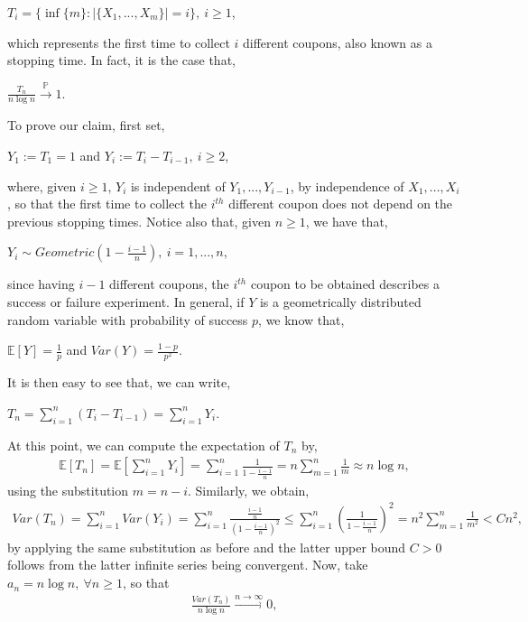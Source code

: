\documentclass{article}
\begin{document}
\begin{center}
	$T_i = \{ \inf \{m\}: |\{X_1,...,X_m\}| = i \}, \ i\geq1$,
\end{center}
which represents the first time to collect $i$ different coupons, also known as a stopping time. In fact, it is the case that,
\begin{center}
	$\frac{T_n}{n\log{n}} \xrightarrow{\mathbb{P}} 1$.
\end{center}
To prove our claim, first set,
\begin{center}
	$Y_1 := T_1 = 1$ and $Y_i := T_i - T_{i-1}, \ i\geq2$,
\end{center}
where, given $i\geq1$, $Y_i$ is independent of $Y_1,...,Y_{i-1}$, by independence of $X_1,...,X_i$, so that the first time to collect the $i^{th}$ different coupon does not depend on the previous stopping times. Notice also that, given $n\geq1$, we have that,
\begin{center}
	$Y_i \sim Geometric(1 - \frac{i-1}{n}), \ i=1,...,n$,
\end{center}
since having $i-1$ different coupons, the $i^{th}$ coupon to be obtained describes a success or failure experiment. In general, if $Y$ is a geometrically distributed random variable with probability of success $p$, we know that,
\begin{center}
	$\mathbb{E}[Y] = \frac{1}{p}$ and $Var(Y) = \frac{1-p}{p^2}$.
\end{center}
It is then easy to see that, we can write,
\begin{center}
	$T_{n} = \sum_{i=1}^{n}(T_i - T_{i-1}) = \sum_{i=1}^{n}Y_i$.
\end{center}
At this point, we can compute the expectation of $T_n$ by,
\begin{eqnarray}
\nonumber
\mathbb{E}[T_n] = \mathbb{E}\left[\sum_{i=1}^{n}Y_i\right] = \sum_{i=1}^{n}\frac{1}{1-\frac{i-1}{n}} = n\sum_{m=1}^{n}\frac{1}{m} \approx n\log{n},
\end{eqnarray}
using the substitution $m = n-i$. Similarly, we obtain,
\begin{eqnarray}
\nonumber
Var(T_n) = \sum_{i=1}^{n}Var(Y_i) = \sum_{i=1}^{n}\frac{\frac{i-1}{n}}{(1-\frac{i-1}{n})^2} \leq \sum_{i=1}^{n}\left(\frac{1}{1-\frac{i-1}{n}}\right)^2 = n^2\sum_{m=1}^{n}\frac{1}{m^2} < Cn^2,
\end{eqnarray}
by applying the same substitution as before and the latter upper bound $C > 0$ follows from the latter infinite series being convergent. Now, take $a_n = n\log{n}, \ \forall n\geq1$, so that
\begin{eqnarray}
\nonumber
\frac{Var(T_n)}{n\log{n}} \xrightarrow{n\to\infty} 0,
\end{eqnarray}
\end{document}
